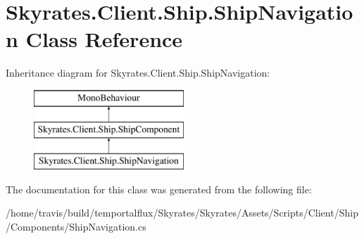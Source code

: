 \hypertarget{class_skyrates_1_1_client_1_1_ship_1_1_ship_navigation}{\section{Skyrates.\-Client.\-Ship.\-Ship\-Navigation Class Reference}
\label{class_skyrates_1_1_client_1_1_ship_1_1_ship_navigation}
}
Inheritance diagram for Skyrates.\-Client.\-Ship.\-Ship\-Navigation\-:\begin{figure}[H]
\begin{center}
\leavevmode
\includegraphics[height=3.000000cm]{class_skyrates_1_1_client_1_1_ship_1_1_ship_navigation}
\end{center}
\end{figure}


The documentation for this class was generated from the following file\-:\begin{DoxyCompactItemize}
\item 
/home/travis/build/temportalflux/\-Skyrates/\-Skyrates/\-Assets/\-Scripts/\-Client/\-Ship/\-Components/Ship\-Navigation.\-cs\end{DoxyCompactItemize}
